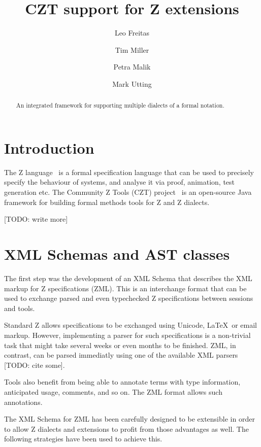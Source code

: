 \documentclass{llncs}
\begin{document}
\title{CZT support for Z extensions}
\author{Leo Freitas \and Tim Miller \and Petra Malik \and Mark Utting}
\maketitle

\begin{abstract}
  An integrated framework for supporting multiple dialects of a formal
  notation.
\end{abstract}

\section{Introduction} \label{sec:intro}

  The Z language~\cite{isoz} is a formal specification language that
  can be used to precisely specify the behaviour of systems, and
  analyse it via proof, animation, test generation etc.  The Community
  Z Tools (CZT) project~\cite{czt} is an open-source Java framework
  for building formal methods tools for Z and Z dialects.

  [TODO: write more]

\section{XML Schemas and AST classes}

  The first step was the development of an XML Schema\cite{UttEA:03}
  that describes the XML markup for Z specifications (ZML).  This is
  an interchange format that can be used to exchange parsed and even
  typechecked Z specifications between sessions and tools.

  Standard Z allows specifications to be exchanged using Unicode,
  \LaTeX\ or email markup.  However, implementing a parser for such
  specifications is a non-trivial task that might take several weeks
  or even months to be finished.  ZML, in contrast, can be parsed
  immediatly using one of the available XML parsers [TODO: cite some].

  Tools also benefit from being able to annotate terms with type
  information, anticipated usage, comments, and so on.  The ZML format
  allows such annotations.

  The XML Schema for ZML has been carefully designed to be extensible
  in order to allow Z dialects and extensions to profit from those
  advantages as well.  The following strategies have been used to
  achieve this.
\end{document}

